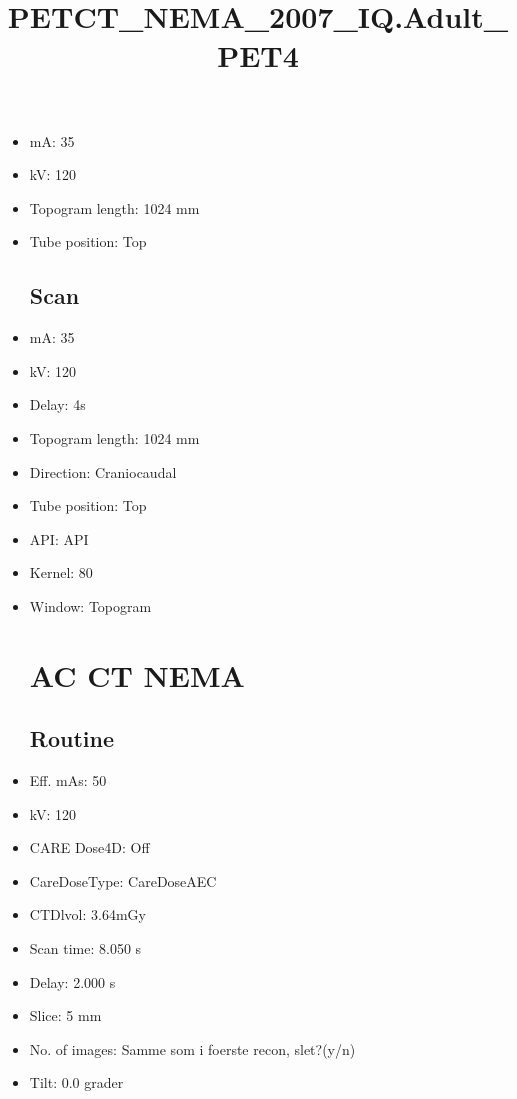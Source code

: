 \documentclass[12pt]{article}
\title{PETCT\_NEMA\_2007\_IQ.Adult\_PET4}
\begin{document}
\maketitle
\newpage
\tableofcontents
\newpage
{}


\begin{itemize}\section{Topogram}
\subsection{Routine}
\item mA: 35\item kV: 120\item Topogram length: 1024 mm\item Tube position: Top
\subsection{Scan}\item mA: 35\item kV: 120\item Delay: 4s\item Topogram length: 1024 mm\item Direction: Craniocaudal\item Tube position: Top\item API: API \item Kernel: 80\item Window: Topogram
\section{AC CT NEMA}
\subsection{Routine}
\item Eff. mAs: 50\item kV: 120\item CARE Dose4D: Off\item CareDoseType: CareDoseAEC\item CTDlvol: 3.64mGy\item Scan time: 8.050 s\item Delay: 2.000 s\item Slice: 5 mm\item No. of images: Samme som i foerste recon, slet?(y/n)\item Tilt: 0.0 grader

\end{itemize}
\end{document}
